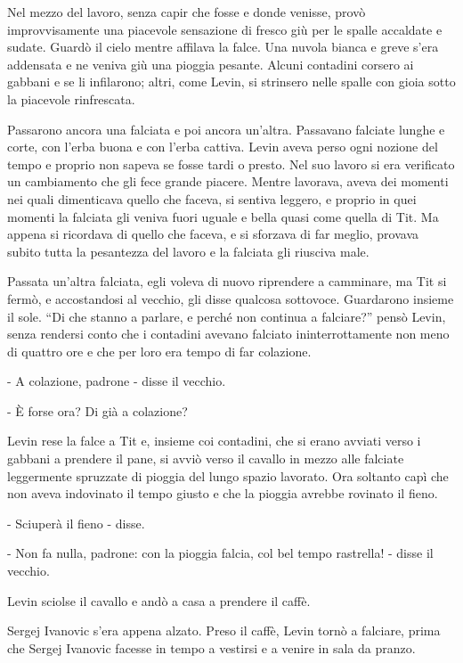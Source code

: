 Nel mezzo del lavoro, senza capir che fosse e donde venisse, provò improvvisamente una piacevole sensazione di fresco giù per le spalle accaldate e sudate. Guardò il cielo mentre affilava la falce. Una nuvola bianca e greve s'era addensata e ne veniva giù una pioggia pesante. Alcuni contadini corsero ai gabbani e se li infilarono; altri, come Levin, si strinsero nelle spalle con gioia sotto la piacevole rinfrescata. 

Passarono ancora una falciata e poi ancora un'altra. Passavano falciate lunghe e corte, con l'erba buona e con l'erba cattiva. Levin aveva perso ogni nozione del tempo e proprio non sapeva se fosse tardi o presto. Nel suo lavoro si era verificato un cambiamento che gli fece grande piacere. Mentre lavorava, aveva dei momenti nei quali dimenticava quello che faceva, si sentiva leggero, e proprio in quei momenti la falciata gli veniva fuori uguale e bella quasi come quella di Tit. Ma appena si ricordava di quello che faceva, e si sforzava di far meglio, provava subito tutta la pesantezza del lavoro e la falciata gli riusciva male. 

Passata un'altra falciata, egli voleva di nuovo riprendere a camminare, ma Tit si fermò, e accostandosi al vecchio, gli disse qualcosa sottovoce. Guardarono insieme il sole. ``Di che stanno a parlare, e perché non continua a falciare?'' pensò Levin, senza rendersi conto che i contadini avevano falciato ininterrottamente non meno di quattro ore e che per loro era tempo di far colazione. 

- A colazione, padrone - disse il vecchio. 

- È forse ora? Di già a colazione? 

Levin rese la falce a Tit e, insieme coi contadini, che si erano avviati verso i gabbani a prendere il pane, si avviò verso il cavallo in mezzo alle falciate leggermente spruzzate di pioggia del lungo spazio lavorato. Ora soltanto capì che non aveva indovinato il tempo giusto e che la pioggia avrebbe rovinato il fieno. 

- Sciuperà il fieno - disse. 

- Non fa nulla, padrone: con la pioggia falcia, col bel tempo rastrella! - disse il vecchio. 

Levin sciolse il cavallo e andò a casa a prendere il caffè. 

Sergej Ivanovic s'era appena alzato. Preso il caffè, Levin tornò a falciare, prima che Sergej Ivanovic facesse in tempo a vestirsi e a venire in sala da pranzo. 


